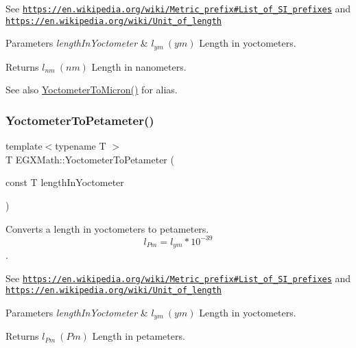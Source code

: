 See \href{https://en.wikipedia.org/wiki/Metric_prefix#List_of_SI_prefixes}{\tt https\+://en.\+wikipedia.\+org/wiki/\+Metric\+\_\+prefix\#\+List\+\_\+of\+\_\+\+S\+I\+\_\+prefixes} and \href{https://en.wikipedia.org/wiki/Unit_of_length}{\tt https\+://en.\+wikipedia.\+org/wiki/\+Unit\+\_\+of\+\_\+length} 
\begin{DoxyParams}{Parameters}
{\em length\+In\+Yoctometer} & $ l_{ym}\ (ym)$ Length in yoctometers. \\
\hline
\end{DoxyParams}
\begin{DoxyReturn}{Returns}
$ l_{nm}\ (nm)$ Length in nanometers. 
\end{DoxyReturn}
\begin{DoxySeeAlso}{See also}
\mbox{\hyperlink{group___e_g_x_math-_conversions-_length_conversions-_s_i-_yoctometer-_non-_s_i_ga4863fe4d5268ab023ec32d0281171b55}{Yoctometer\+To\+Micron()}} for alias. 
\end{DoxySeeAlso}
\mbox{\label{group___e_g_x_math-_conversions-_length_conversions-_s_i-_yoctometer-_s_i_ga8336f2eef297fcf72ddb1fc0f79dfa5e}} 
\subsubsection{\texorpdfstring{Yoctometer\+To\+Petameter()}{YoctometerToPetameter()}}
{\footnotesize\ttfamily template$<$typename T $>$ \\
T E\+G\+X\+Math\+::\+Yoctometer\+To\+Petameter (\begin{DoxyParamCaption}\item[{const T}]{length\+In\+Yoctometer }\end{DoxyParamCaption})}



Converts a length in yoctometers to petameters. \[ l_{Pm}=l_{ym} * 10^{-39} \]. 

See \href{https://en.wikipedia.org/wiki/Metric_prefix#List_of_SI_prefixes}{\tt https\+://en.\+wikipedia.\+org/wiki/\+Metric\+\_\+prefix\#\+List\+\_\+of\+\_\+\+S\+I\+\_\+prefixes} and \href{https://en.wikipedia.org/wiki/Unit_of_length}{\tt https\+://en.\+wikipedia.\+org/wiki/\+Unit\+\_\+of\+\_\+length} 
\begin{DoxyParams}{Parameters}
{\em length\+In\+Yoctometer} & $ l_{ym}\ (ym)$ Length in yoctometers. \\
\hline
\end{DoxyParams}
\begin{DoxyReturn}{Returns}
$ l_{Pm}\ (Pm)$ Length in petameters. 
\end{DoxyReturn}
\mbox{\label{group___e_g_x_math-_conversions-_length_conversions-_s_i-_yoctometer-_s_i_gab621b78b78d6776131912bd6038901b9}} 
